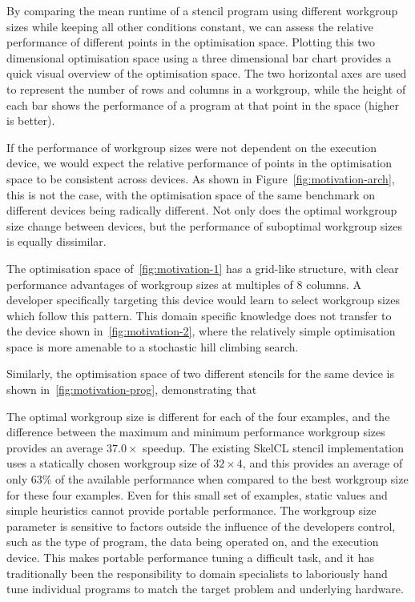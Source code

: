 By comparing the mean runtime of a stencil program using different
workgroup sizes while keeping all other conditions constant, we can
assess the relative performance of different points in the
optimisation space. Plotting this two dimensional optimisation space
using a three dimensional bar chart provides a quick visual overview
of the optimisation space. The two horizontal axes are used to
represent the number of rows and columns in a workgroup, while the
height of each bar shows the performance of a program at that point in
the space (higher is better).

If the performance of workgroup sizes were not dependent on the
execution device, we would expect the relative performance of points
in the optimisation space to be consistent across devices. As shown in
Figure~\ref{fig:motivation-arch}, this is not the case, with the
optimisation space of the same benchmark on different devices being
radically different. Not only does the optimal workgroup size change
between devices, but the performance of suboptimal workgroup sizes is
equally dissimilar.

The optimisation space of~\ref{fig:motivation-1} has a grid-like
structure, with clear performance advantages of workgroup sizes at
multiples of 8 columns. A developer specifically targeting this device
would learn to select workgroup sizes which follow this pattern. This
domain specific knowledge does not transfer to the device shown
in~\ref{fig:motivation-2}, where the relatively simple optimisation
space is more amenable to a stochastic hill climbing search.

Similarly, the optimisation space of two different stencils for the
same device is shown in~\ref{fig:motivation-prog}, demonstrating that
\TODO{\ldots}

The optimal workgroup size is different for each of the four examples,
and the difference between the maximum and minimum performance
workgroup sizes provides an average $37.0\times$ speedup. The existing
SkelCL stencil implementation uses a statically chosen workgroup size
of $32\times4$, and this provides an average of only 63\% of the
available performance when compared to the best workgroup size for
these four examples. Even for this small set of examples, static
values and simple heuristics cannot provide portable performance. The
workgroup size parameter is sensitive to factors outside the influence
of the developers control, such as the type of program, the data being
operated on, and the execution device. This makes portable performance
tuning a difficult task, and it has traditionally been the
responsibility to domain specialists to laboriously hand tune
individual programs to match the target problem and underlying
hardware.

